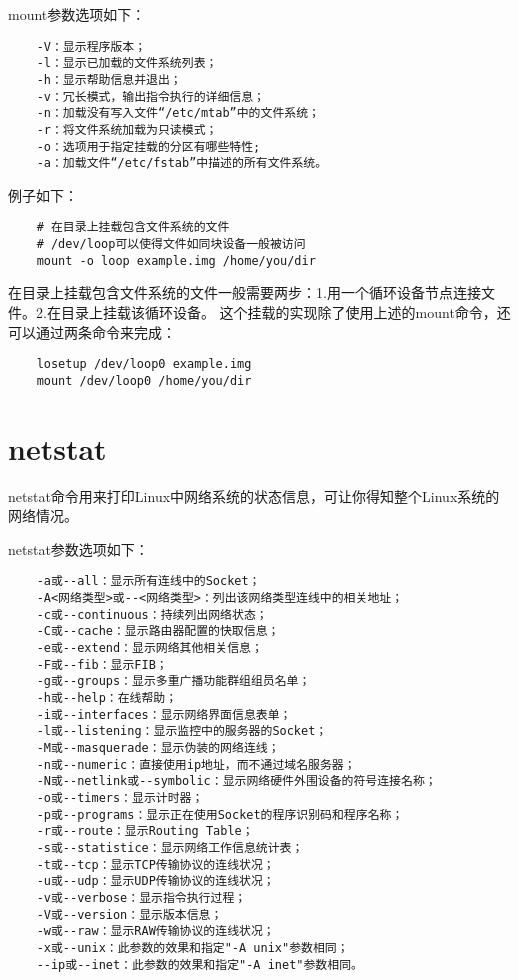 \documentclass[a4paper,left=2.5cm,right=2.5cm,11pt]{article}
\begin{document}
	mount参数选项如下：
	\begin{lstlisting}
	-V：显示程序版本； 
	-l：显示已加载的文件系统列表； 
	-h：显示帮助信息并退出； 
	-v：冗长模式，输出指令执行的详细信息； 
	-n：加载没有写入文件“/etc/mtab”中的文件系统； 
	-r：将文件系统加载为只读模式； 
	-o：选项用于指定挂载的分区有哪些特性;
	-a：加载文件“/etc/fstab”中描述的所有文件系统。
	\end{lstlisting}

	例子如下：
	\begin{lstlisting}
	# 在目录上挂载包含文件系统的文件
	# /dev/loop可以使得文件如同块设备一般被访问
	mount -o loop example.img /home/you/dir
	\end{lstlisting}

	在目录上挂载包含文件系统的文件一般需要两步：1.用一个循环设备节点连接文件。2.在目录上挂载该循环设备。
	这个挂载的实现除了使用上述的mount命令，还可以通过两条命令来完成：
	\begin{lstlisting}
	losetup /dev/loop0 example.img
	mount /dev/loop0 /home/you/dir
	\end{lstlisting}

\section{netstat}
	netstat命令用来打印Linux中网络系统的状态信息，可让你得知整个Linux系统的网络情况。\par

	netstat参数选项如下：
	\begin{lstlisting}
	-a或--all：显示所有连线中的Socket； 
	-A<网络类型>或--<网络类型>：列出该网络类型连线中的相关地址； 
	-c或--continuous：持续列出网络状态； 
	-C或--cache：显示路由器配置的快取信息； 
	-e或--extend：显示网络其他相关信息； 
	-F或--fib：显示FIB； 
	-g或--groups：显示多重广播功能群组组员名单； 
	-h或--help：在线帮助； 
	-i或--interfaces：显示网络界面信息表单； 
	-l或--listening：显示监控中的服务器的Socket； 
	-M或--masquerade：显示伪装的网络连线； 
	-n或--numeric：直接使用ip地址，而不通过域名服务器； 
	-N或--netlink或--symbolic：显示网络硬件外围设备的符号连接名称； 
	-o或--timers：显示计时器； 
	-p或--programs：显示正在使用Socket的程序识别码和程序名称； 
	-r或--route：显示Routing Table； 
	-s或--statistice：显示网络工作信息统计表； 
	-t或--tcp：显示TCP传输协议的连线状况； 
	-u或--udp：显示UDP传输协议的连线状况； 
	-v或--verbose：显示指令执行过程； 
	-V或--version：显示版本信息； 
	-w或--raw：显示RAW传输协议的连线状况； 
	-x或--unix：此参数的效果和指定"-A unix"参数相同； 
	--ip或--inet：此参数的效果和指定"-A inet"参数相同。
	\end{lstlisting}
\end{document}
